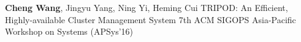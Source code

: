 \cvpub
{\textbf{Cheng Wang}, Jingyu Yang, Ning Yi, Heming Cui} %
{TRIPOD: An Efficient, Highly-available Cluster Management System} %
{} %
{} %
{ %
7th ACM SIGOPS Asia-Pacific Workshop on Systems (APSys'16)
}
